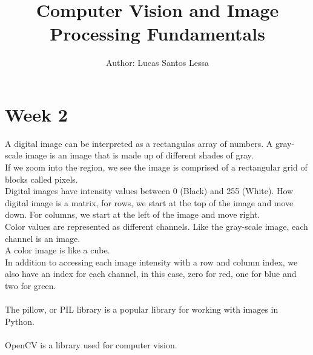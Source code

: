 \documentclass[journal]{IEEEtran}
\begin{document}
\title{Computer Vision and Image Processing Fundamentals}


\author{ Author: Lucas Santos Lessa}

\maketitle

\IEEEpeerreviewmaketitle

\section{Week 2}

A digital image can be interpreted as a rectangulas array of numbers.
A gray-scale image is an image that is made up of different shades of gray.\\
If we zoom into the region,
we see the image is comprised of
a rectangular grid of blocks called pixels.\\
Digital images have intensity values between 0 (Black) and 255 (White).
How digital image is a matrix, for rows, we start at the top of the image and move down.
For columns, we start at
the left of the image and move right.
\\
Color values are represented as different channels.
Like the gray-scale image,
each channel is an image.
\\
A color image is like a cube.
\\
In addition to accessing
each image intensity with a row and column index,
we also have an index for each channel, in this case,
zero for red, one for blue and two for green.
\\
\\
The pillow, or PIL library is
a popular library for working with images in Python.
\\
\\
OpenCV is a library used for computer vision.
\\
\\

\ifCLASSOPTIONcaptionsoff
  \newpage
\fi

\end{document}
